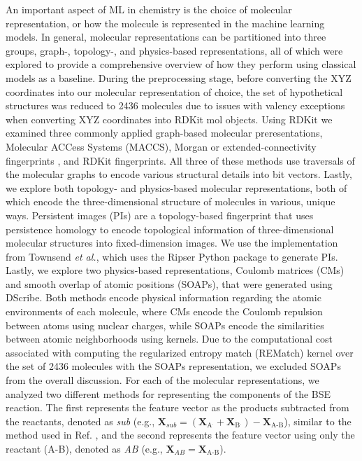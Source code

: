 \documentclass[journal=jacsat,manuscript=article]{achemso}
\begin{document}
An important aspect of ML in chemistry is the choice of molecular representation, or how the molecule is represented in the machine learning models.\cite{jones_molecular_2023}
In general, molecular representations can be partitioned into three groups, graph-, topology-, and physics-based representations, all of which were explored to provide a comprehensive overview of how they perform using classical models as a baseline.
During the preprocessing stage, before converting the XYZ coordinates into our molecular representation of choice, the set of hypothetical structures was reduced to 2436 molecules due to issues with valency exceptions when converting XYZ coordinates into RDKit mol objects.
Using RDKit\cite{noauthor_rdkit_nodate} we examined three commonly applied graph-based molecular preresentations, Molecular ACCess Systems (MACCS)\cite{durant_reoptimization_2002}, Morgan or extended-connectivity fingerprints \cite{morgan_generation_1965,rogers_extended-connectivity_2010}, and RDKit fingerprints.
All three of these methods use traversals of the molecular graphs to encode various structural details into bit vectors.
Lastly, we explore both topology- and physics-based molecular representations, both of which encode the three-dimensional structure of molecules in various, unique ways.
Persistent images (PIs) are a topology-based fingerprint that uses persistence homology to encode topological information of three-dimensional molecular structures into fixed-dimension images.\cite{adams_persistence_2017,townsend_representation_2020,schiff_augmenting_2022} 
We use the implementation from Townsend \textit{et al.}\cite{townsend_representation_2020}, which uses the Ripser Python package to generate PIs.\cite{tralie_ripserpy_2018}
Lastly, we explore two physics-based representations, Coulomb matrices (CMs) \cite{rupp_fast_2012} and smooth overlap of atomic positions (SOAPs), that were generated using DScribe.\cite{de_comparing_2016}
Both methods encode physical information regarding the atomic environments of each molecule, where CMs encode the Coulomb repulsion between atoms using nuclear charges, while SOAPs encode the similarities between atomic neighborhoods using kernels.
Due to the computational cost associated with computing the regularized entropy match (REMatch) kernel over the set of 2436 molecules with the SOAPs representation, we excluded SOAPs from the overall discussion.
For each of the molecular representations, we analyzed two different methods for representing the components of the BSE reaction.
The first represents the feature vector as the products subtracted from the reactants, denoted as \textit{sub} (e.g., $\mathbf{X}_{\mathit{sub}} = (\mathbf{X}_{\text{A}^{.}} + \mathbf{X}_{\text{B}^{.}}) - \mathbf{X}_{\text{A-B}}$), similar to the method used in Ref. \cite{garcia-andrade_barrier_2023}, and the second represents the feature vector using only the reactant (A-B), denoted as \textit{AB} (e.g., $\mathbf{X}_{\mathit{AB}} =  \mathbf{X}_{\text{A-B}}$).
\end{document}

